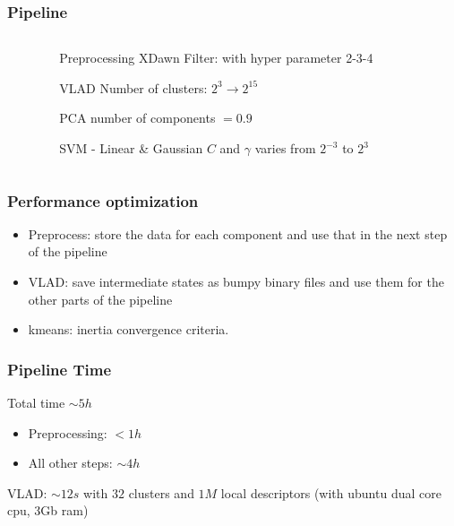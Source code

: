 \documentclass{beamer}
\begin{document}
\begin{frame}


\frametitle{Pipeline}
\begin{columns}[T]
\begin{column}{.1\textwidth}

\end{column}
\begin{column}{.8\textwidth}
\begin{block}{Preprocessing}
XDawn Filter: with hyper parameter 2-3-4 
\end{block}

\begin{block}{VLAD}
Number of clusters: $2^3\rightarrow 2^{15}$ 
\end{block}

\begin{block}{PCA}
number of components $=0.9$
\end{block}

\begin{block}{SVM - Linear \& Gaussian}
$C$ and $\gamma$ varies from $2^{-3}$ to $ 2^{3}$ 
\end{block}
\end{column} 
\begin{column}{.1\textwidth}

\end{column}
\end{columns}
\end{frame}


\begin{frame}
\frametitle{Performance optimization}
\begin{itemize}
\item Preprocess:  store the data for each component and use that in the next step of the pipeline
\item VLAD: save intermediate states as bumpy binary files and use them for the other parts of the pipeline
\item kmeans: inertia convergence criteria. 
\end{itemize} 
\end{frame}



\begin{frame}
\frametitle{Pipeline Time}
Total time $ \sim   5h$ 
\begin{itemize}
\item Preprocessing: $< 1h$
\item All other steps:  $\sim4h$ 
\end{itemize}
VLAD:  $ \sim   12s$ with $32$ clusters and $1M$ local descriptors (with ubuntu dual core cpu, 3Gb ram)
\end{frame}
\end{document}
